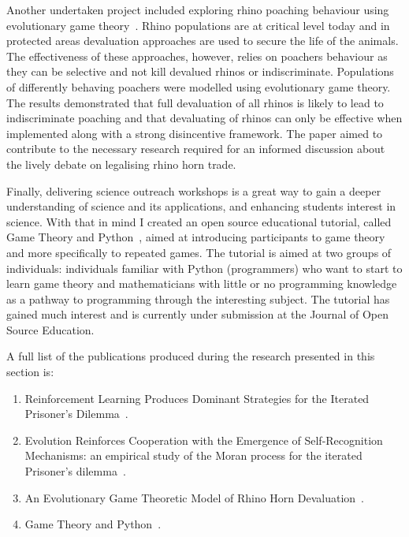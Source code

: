 Another undertaken project included exploring rhino poaching behaviour using
evolutionary game theory~\cite{Glynatsi2018}. Rhino populations are at critical
level today and in protected areas devaluation approaches are used to secure the
life of the animals. The effectiveness of these approaches, however, relies on
poachers behaviour as they can be selective and not kill devalued rhinos or
indiscriminate. Populations of differently behaving poachers were modelled using
evolutionary game theory. The results
demonstrated that full devaluation of all rhinos is likely to lead to
indiscriminate poaching and that devaluating of rhinos can only be effective
when implemented along with a strong disincentive framework. The paper aimed to
contribute to the necessary research required for an informed discussion about
the lively debate on legalising rhino horn trade.

Finally, delivering science outreach workshops is a great way to gain a deeper
understanding of science and its applications, and enhancing students interest
in science. With that in mind I created an open source educational tutorial, called Game
Theory and Python~\cite{Glynatsi2017_game}, aimed at introducing participants to
game theory and more specifically to repeated games. The tutorial is
aimed at two groups of individuals: individuals familiar with Python (programmers) who want
to start to learn game theory and mathematicians with little or no programming
knowledge as a pathway to programming through the interesting subject. The
tutorial has gained much interest and is currently under submission at the
Journal of Open Source Education.

A full list of the publications produced during the research presented in this
section is:

\begin{enumerate}
    \item Reinforcement Learning Produces Dominant Strategies for the
    Iterated Prisoner's Dilemma~\cite{Knight2017}.
    \item Evolution Reinforces Cooperation with the Emergence of Self-Recognition
    Mechanisms: an empirical study of the Moran process for the iterated
    Prisoner's dilemma~\cite{Harper2017}.
    \item An Evolutionary Game Theoretic Model of Rhino Horn Devaluation~\cite{Glynatsi2018}.
    \item Game Theory and Python~\cite{Glynatsi2017_game}.
\end{enumerate}

